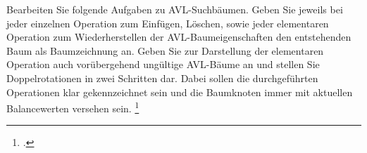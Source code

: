 \documentclass{bschlangaul-aufgabe}
\begin{document}

Bearbeiten Sie folgende Aufgaben zu AVL-Suchbäumen. Geben Sie jeweils
bei jeder einzelnen Operation zum Einfügen, Löschen, sowie jeder
elementaren Operation zum Wiederherstellen der AVL-Baumeigenschaften den
entstehenden Baum als Baumzeichnung an. Geben Sie zur Darstellung der
elementaren Operation auch vorübergehend ungültige AVL-Bäume an und
stellen Sie Doppelrotationen in zwei Schritten dar. Dabei sollen die
durchgeführten Operationen klar gekennzeichnet sein und die Baumknoten
immer mit aktuellen Balancewerten versehen sein.
\footcite{examen:66115:2018:03}
\end{document}
